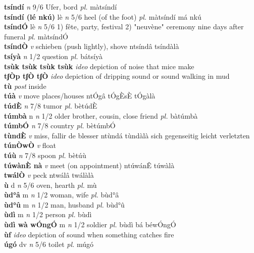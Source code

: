 \documentclass{article}
\begin{document}
{\bf tsíndí}  {\it n} 9/6 Ufer, bord {\it pl.} màtsíndí         \\ 
{\bf tsíndí (lé nkú)} lè {\it n} 5/6 heel (of the foot) {\it pl.} màtsíndí má nkú         \\ 
{\bf tsíndÓ} lè {\it n} 5/6 1) fête, party, festival 2) "neuvène" ceremony nine days after funeral {\it pl.} màtsíndÓ         \\ 
{\bf tsíndÒ}  {\it v} schieben (push lightly), shove   ntsíndâ   tsíndàlà   \\ 
{\bf tsíyà}  {\it n} 1/2 question {\it pl.} bátsíyà         \\ 
{\bf tsùk tsùk tsùk tsùk}  {\it ideo} depiction of noise that mice make         \\ 
{\bf tʃÒp tʃÒ tʃÒ}  {\it ideo} depiction of dripping sound or sound walking in mud         \\ 
{\bf tù}  {\it post} inside         \\ 
{\bf túà}  {\it v} move places/houses   ntÓgâ  tÓgÈsÈ tÓgàlà   \\ 
{\bf túdÈ}  {\it n} 7/8 tumor {\it pl.} bètúdÈ         \\ 
{\bf túmbà} n {\it n} 1/2 older brother, cousin, close friend {\it pl.} bàtúmbà         \\ 
{\bf túmbÓ}  {\it n} 7/8 country {\it pl.} bètúmbÓ         \\ 
{\bf tùndÈ}  {\it v} miss, fallir de blesser   ntùndá   tùndàlà sich gegenseitig leicht verletzten   \\ 
{\bf túnÒwÒ}  {\it v} float         \\ 
{\bf túù}  {\it n} 7/8 spoon {\it pl.} bètúù         \\ 
{\bf túwànÈ nà}  {\it v} meet (on appointment)   ntúwánÊ   túwàlà   \\ 
{\bf twálÒ}  {\it v} peck   ntwálâ   twálàlà   \\ 
{\bf ù} d {\it n} 5/6 oven, hearth {\it pl.} mù         \\ 
{\bf ùd°â} m {\it n} 1/2 woman, wife {\it pl.} bùd°â         \\ 
{\bf ùd°û} m {\it n} 1/2 man, husband {\it pl.} bùd°û         \\ 
{\bf ùdì} m {\it n} 1/2 person {\it pl.} bùdì         \\ 
{\bf ùdì wà wÓngÓ} m {\it n} 1/2 soldier {\it pl.} bùdì bá béwÓngÓ         \\ 
{\bf ùf}  {\it ideo} depiction of sound when something catches fire         \\ 
{\bf úgó} dv {\it n} 5/6 toilet {\it pl.} múgó         \\ 
\end{document}
